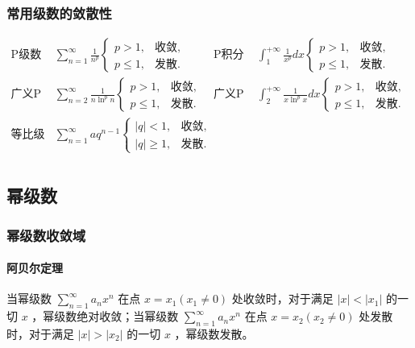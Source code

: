 ﻿\documentclass[a4paper,12pt,UTF8]{ctexart}
\begin{document}
    \subsubsection{常用级数的敛散性}
    \begin{align*}
        \text{P级数}\enspace& \sum_{n=1}^{\infty}\frac{1}{n^{p}}
        \begin{cases}
            p>1,&\text{收敛},\\
            p \leq 1,&\text{发散}.
        \end{cases}&
        \text{P积分}\enspace& \int_{1}^{+\infty}\frac{1}{x^{p}}dx
        \begin{cases}
            p>1,&\text{收敛},\\
            p \leq 1,&\text{发散}.
        \end{cases}&\\
        \text{广义P级数}\enspace& \sum_{n=2}^{\infty}\frac{1}{n \ln^p n}
        \begin{cases}
            p>1,&\text{收敛},\\
            p \leq 1,&\text{发散}.
        \end{cases}&
        \text{广义P积分}\enspace& \int_{2}^{+\infty}\frac{1}{x \ln^p x}dx
        \begin{cases}
            p>1,&\text{收敛},\\
            p \leq 1,&\text{发散}.
        \end{cases}&\\
        \text{等比级数}\enspace& \sum_{n=1}^{\infty}aq^{n-1}
        \begin{cases}
            |q|<1,&\text{收敛},\\
            |q| \geq 1,&\text{发散}.
        \end{cases}&\\
    \end{align*} 

    \subsection{幂级数}

    \subsubsection{幂级数收敛域}

    \paragraph{阿贝尔定理} 当幂级数 \(\sum \limits_{n=1}^{\infty}a_nx^n\) 在点 \(x=x_1(x_1\neq 0)\) 处收敛时，对于满足 \(|x|<|x_1|\) 的一切 \(x\) ，幂级数绝对收敛；当幂级数 \(\sum \limits_{n=1}^{\infty}a_nx^n\) 在点 \(x=x_2(x_2\neq 0)\) 处发散时，对于满足 \(|x|>|x_2|\) 的一切 \(x\) ，幂级数发散。
\end{document}
